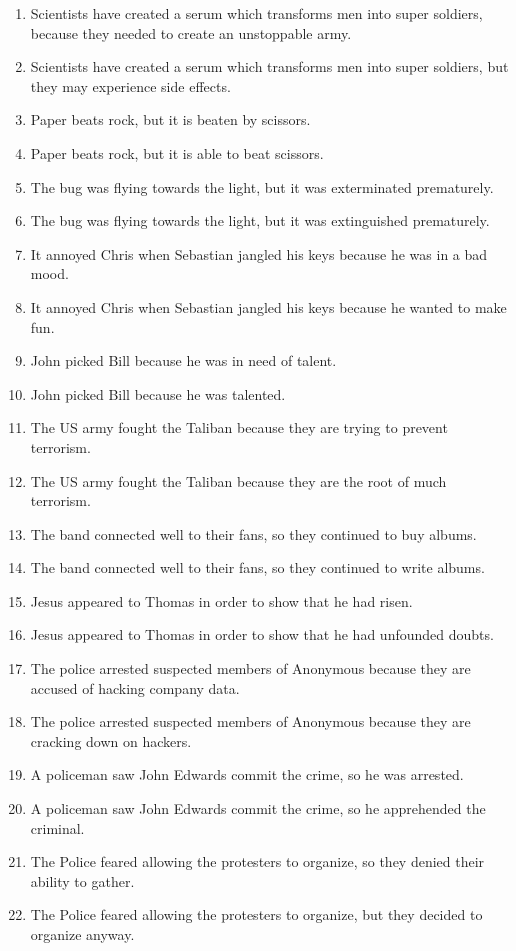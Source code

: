 \documentclass{article}
\begin{document}
\begin{enumerate}
\item Scientists have created a serum which transforms men into super soldiers, because they needed to create an unstoppable army.
\item Scientists have created a serum which transforms men into super soldiers, but they may experience side effects.
\item Paper beats rock, but it is beaten by scissors.
\item Paper beats rock, but it is able to beat scissors.
\item The bug was flying towards the light, but it was exterminated prematurely.
\item The bug was flying towards the light, but it was extinguished prematurely.
\item It annoyed Chris when Sebastian jangled his keys because he was in a bad mood.
\item It annoyed Chris when Sebastian jangled his keys because he wanted to make fun.
\item John picked Bill because he was in need of talent.
\item John picked Bill because he was talented.
\item The US army fought the Taliban because they are trying to prevent terrorism.
\item The US army fought the Taliban because they are the root of much terrorism.
\item The band connected well to their fans, so they continued to buy albums.
\item The band connected well to their fans, so they continued to write albums.
\item Jesus appeared to Thomas in order to show that he had risen.
\item Jesus appeared to Thomas in order to show that he had unfounded doubts.
\item The police arrested suspected members of Anonymous because they are accused of hacking company data.
\item The police arrested suspected members of Anonymous because they are cracking down on hackers.
\item A policeman saw John Edwards commit the crime, so he was arrested.
\item A policeman saw John Edwards commit the crime, so he apprehended the criminal.
\item The Police feared allowing the protesters to organize, so they denied their ability to gather.
\item The Police feared allowing the protesters to organize, but they decided to organize anyway.

\end{enumerate}
\end{document}
